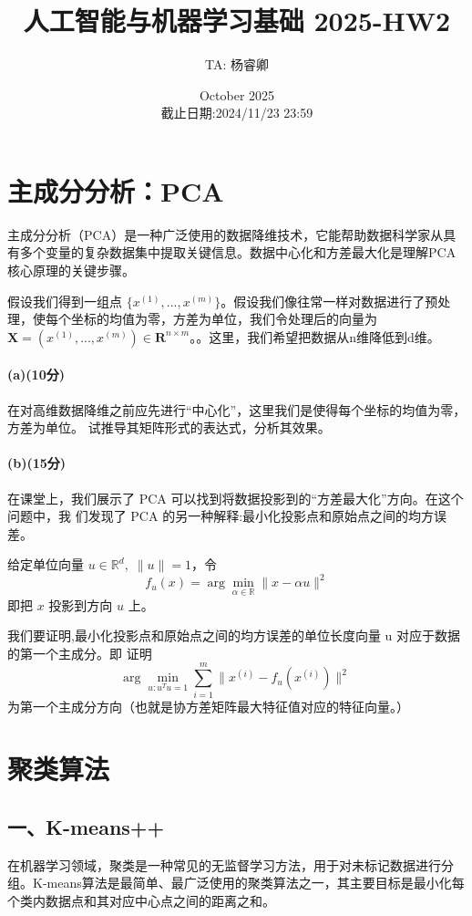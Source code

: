 \documentclass[12pt,a4paper]{article}%
\title{人工智能与机器学习基础 2025-HW2}
\author{TA: 杨睿卿}
\date{October 2025\\截止日期:2024/11/23 23:59}
\begin{document}
\maketitle
\section{主成分分析：PCA}
主成分分析（PCA）是一种广泛使用的数据降维技术，它能帮助数据科学家从具有多个变量的复杂数据集中提取关键信息。数据中心化和方差最大化是理解PCA核心原理的关键步骤。

假设我们得到一组点 $\{x^{(1)}, . . . , x^{(m)}\}$。假设我们像往常一样对数据进行了预处理，使每个坐标的均值为零，方差为单位，我们令处理后的向量为$\textbf{X}=(x^{(1)}, . . . , x^{(m)})\in \mathbf{R}^{n\times m}$。。这里，我们希望把数据从n维降低到d维。

\paragraph*{(a)(10分)}
在对高维数据降维之前应先进行“中心化”，这里我们是使得每个坐标的均值为零，方差为单位。
试推导其矩阵形式的表达式，分析其效果。

\paragraph*{(b)(15分)}
 在课堂上，我们展示了 PCA 可以找到将数据投影到的“方差最大化”方向。在这个问题中，我
们发现了 PCA 的另一种解释:最小化投影点和原始点之间的均方误差。

给定单位向量 \(u\in\mathbb{R}^{d},\;\|u\|=1\)，令  
\[
f_{u}(x)=\arg\min_{\alpha\in\mathbb{R}}\|x-\alpha u\|^{2}
\]  
即把 \(x\) 投影到方向 \(u\) 上。  

我们要证明,最小化投影点和原始点之间的均方误差的单位长度向量 u 对应于数据的第一个主成分。即
证明 
\[
\;\arg\min_{u:u^Tu=1}\sum_{i=1}^{m}\bigl\|x^{(i)}-f_{u}(x^{(i)})\bigr\|^{2}\;\;
\]  
为第一个主成分方向（也就是协方差矩阵最大特征值对应的特征向量。）

\section{聚类算法}
\subsection*{一、K-means++}
在机器学习领域，聚类是一种常见的无监督学习方法，用于对未标记数据进行分组。K-means算法是最简单、最广泛使用的聚类算法之一，其主要目标是最小化每个类内数据点和其对应中心点之间的距离之和。
\end{document}
